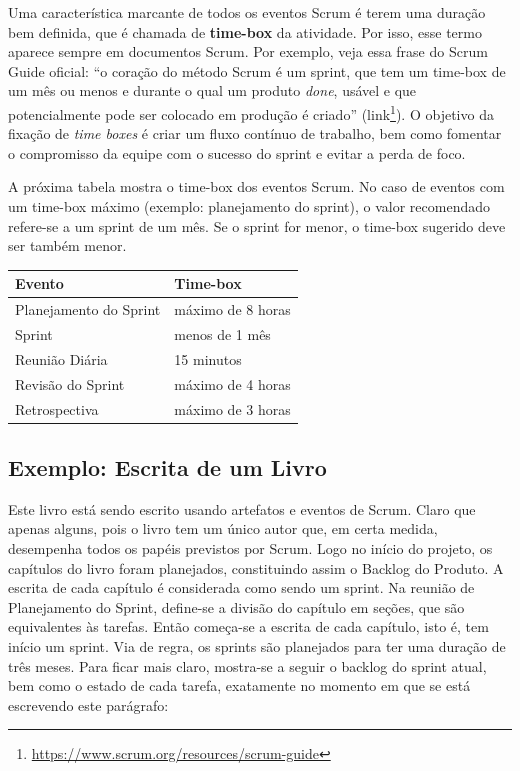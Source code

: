 \documentclass[
  11pt,
  twoside]{book}
\DeclareRobustCommand{\href}[2]{#2\footnote{\url{#1}}}
\begin{document}
 

Uma característica marcante de todos os eventos Scrum é terem uma
duração bem definida, que é chamada de \textbf{time-box} da atividade.
Por isso, esse termo aparece sempre em documentos Scrum. Por exemplo,
veja essa frase do Scrum Guide oficial: ``o coração do método Scrum é um
sprint, que tem um time-box de um mês ou menos e durante o qual um
produto \emph{done}, usável e que potencialmente pode ser colocado em
produção é criado''
(\href{https://www.scrum.org/resources/scrum-guide}{link}). O objetivo
da fixação de \emph{time boxes} é criar um fluxo contínuo de trabalho,
bem como fomentar o compromisso da equipe com o sucesso do sprint e
evitar a perda de foco.

A próxima tabela mostra o time-box dos eventos Scrum. No caso de eventos
com um time-box máximo (exemplo: planejamento do sprint), o valor
recomendado refere-se a um sprint de um mês. Se o sprint for menor, o
time-box sugerido deve ser também menor.

\begin{longtable}[]{@{}ll@{}}
\toprule
\textbf{Evento} & \textbf{Time-box}\tabularnewline
\midrule
\endhead
Planejamento do Sprint & máximo de 8 horas\tabularnewline
Sprint & menos de 1 mês\tabularnewline
Reunião Diária & 15 minutos\tabularnewline
Revisão do Sprint & máximo de 4 horas\tabularnewline
Retrospectiva & máximo de 3 horas\tabularnewline
\bottomrule
\end{longtable}

\hypertarget{exemplo-escrita-de-um-livro}{%
\subsection{Exemplo: Escrita de um
Livro}\label{exemplo-escrita-de-um-livro}}

Este livro está sendo escrito usando artefatos e eventos de Scrum. Claro
que apenas alguns, pois o livro tem um único autor que, em certa medida,
desempenha todos os papéis previstos por Scrum. Logo no início do
projeto, os capítulos do livro foram planejados, constituindo assim o
Backlog do Produto. A escrita de cada capítulo é considerada como sendo
um sprint. Na reunião de Planejamento do Sprint, define-se a divisão do
capítulo em seções, que são equivalentes às tarefas. Então começa-se a
escrita de cada capítulo, isto é, tem início um sprint. Via de regra, os
sprints são planejados para ter uma duração de três meses. Para ficar
mais claro, mostra-se a seguir o backlog do sprint atual, bem como o
estado de cada tarefa, exatamente no momento em que se está escrevendo
este parágrafo:
\end{document}
